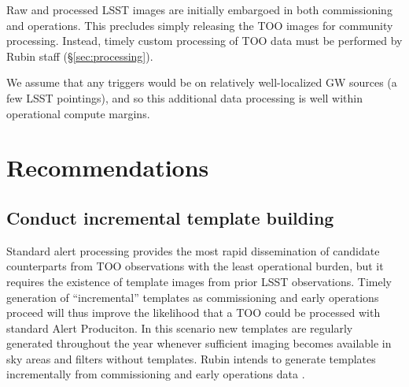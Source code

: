 \documentclass[DM,authoryear,toc]{lsstdoc}
\begin{document}
Raw and processed LSST images are initially embargoed in both commissioning and operations.
This precludes simply releasing the TOO images for community processing.
Instead, timely custom processing of TOO data must be performed by Rubin staff (\S \ref{sec:processing}).

We assume that any triggers would be on relatively well-localized GW sources (a few LSST pointings), and so this additional data processing is well within operational compute margins.

\section{Recommendations}



\subsection{Conduct incremental template building} \label{sec:templates}

Standard alert processing provides the most rapid dissemination of candidate counterparts from TOO observations with the least operational burden, but it requires the existence of template images from prior LSST observations.
Timely generation of ``incremental'' templates as commissioning and early operations proceed will thus improve the likelihood that a TOO could be processed with standard Alert Produciton.
In this scenario new templates are regularly generated throughout the year whenever sufficient imaging becomes available in sky areas and filters without templates.  
Rubin intends to generate templates incrementally from commissioning and early operations data .
\end{document}
